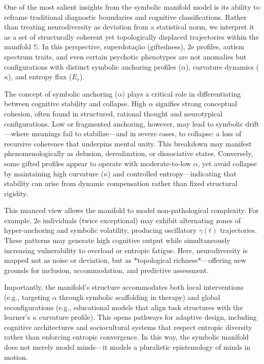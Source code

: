 One of the most salient insights from the symbolic manifold model is its ability to reframe traditional diagnostic boundaries and cognitive classifications. Rather than treating neurodiversity as deviation from a statistical norm, we interpret it as a set of structurally coherent yet topologically displaced trajectories within the manifold $\mathbb{S}$. In this perspective, superdotação (giftedness), 2e profiles, autism spectrum traits, and even certain psychotic phenotypes are not anomalies but configurations with distinct symbolic anchoring profiles ($\alpha$), curvature dynamics ($\kappa$), and entropy flux ($E_r$).

The concept of symbolic anchoring ($\alpha$) plays a critical role in differentiating between cognitive stability and collapse. High $\alpha$ signifies strong conceptual cohesion, often found in structured, rational thought and neurotypical configurations. Low or fragmented anchoring, however, may lead to symbolic drift—where meanings fail to stabilize—and in severe cases, to collapse: a loss of recursive coherence that underpins mental unity. This breakdown may manifest phenomenologically as delusion, derealization, or dissociative states. Conversely, some gifted profiles appear to operate with moderate-to-low $\alpha$, yet avoid collapse by maintaining high curvature ($\kappa$) and controlled entropy—indicating that stability can arise from dynamic compensation rather than fixed structural rigidity.

This nuanced view allows the manifold to model non-pathological complexity. For example, 2e individuals (twice exceptional) may exhibit alternating zones of hyper-anchoring and symbolic volatility, producing oscillatory $\gamma(t)$ trajectories. These patterns may generate high cognitive output while simultaneously increasing vulnerability to overload or entropic fatigue. Here, neurodiversity is mapped not as noise or deviation, but as *topological richness*—offering new grounds for inclusion, accommodation, and predictive assessment.

Importantly, the manifold’s structure accommodates both local interventions (e.g., targeting $\alpha$ through symbolic scaffolding in therapy) and global reconfigurations (e.g., educational models that align task structures with the learner’s $\kappa$ curvature profile). This opens pathways for adaptive design, including cognitive architectures and sociocultural systems that respect entropic diversity rather than enforcing entropic convergence. In this way, the symbolic manifold does not merely model minds—it models a pluralistic epistemology of minds in motion.

